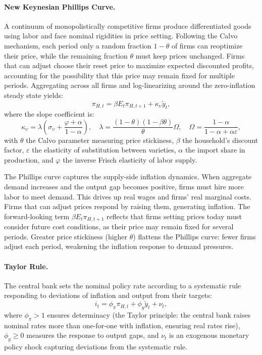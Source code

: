 \documentclass[12pt,a4paper]{article}
\begin{document}
\paragraph{New Keynesian Phillips Curve.}
A continuum of monopolistically competitive firms produce differentiated goods using labor and face nominal rigidities in price setting. Following the Calvo mechanism, each period only a random fraction $1-\theta$ of firms can reoptimize their price, while the remaining fraction $\theta$ must keep prices unchanged. Firms that can adjust choose their reset price to maximize expected discounted profits, accounting for the possibility that this price may remain fixed for multiple periods. Aggregating across all firms and log-linearizing around the zero-inflation steady state yields:
\begin{equation}
	\pi_{H,t} = \beta E_t\pi_{H,t+1} + \kappa_\upsilon\tilde{y}_t,
	\label{eq:NKPC_baseline}
\end{equation}
where the slope coefficient is:
\begin{equation}
	\kappa_\upsilon = \lambda\left(\sigma_\upsilon + \frac{\varphi+\alpha}{1-\alpha}\right), \quad \lambda = \frac{(1-\theta)(1-\beta\theta)}{\theta}\Omega, \quad \Omega = \frac{1-\alpha}{1-\alpha+\alpha\varepsilon},
	\label{eq:kappa}
\end{equation}
with $\theta$ the Calvo parameter measuring price stickiness, $\beta$ the household's discount factor, $\varepsilon$ the elasticity of substitution between varieties, $\alpha$ the import share in production, and $\varphi$ the inverse Frisch elasticity of labor supply.

The Phillips curve captures the supply-side inflation dynamics. When aggregate demand increases and the output gap becomes positive, firms must hire more labor to meet demand. This drives up real wages and firms' real marginal costs. Firms that can adjust prices respond by raising them, generating inflation. The forward-looking term $\beta E_t\pi_{H,t+1}$ reflects that firms setting prices today must consider future cost conditions, as their price may remain fixed for several periods. Greater price stickiness (higher $\theta$) flattens the Phillips curve: fewer firms adjust each period, weakening the inflation response to demand pressures.

\paragraph{Taylor Rule.}
The central bank sets the nominal policy rate according to a systematic rule responding to deviations of inflation and output from their targets:
\begin{equation}
	i_t = \phi_\pi \pi_{H,t} + \phi_y\tilde{y}_t + \nu_t,
	\label{eq:Taylor_baseline}
\end{equation}
where $\phi_\pi > 1$ ensures determinacy (the Taylor principle: the central bank raises nominal rates more than one-for-one with inflation, ensuring real rates rise), $\phi_y \geq 0$ measures the response to output gaps, and $\nu_t$ is an exogenous monetary policy shock capturing deviations from the systematic rule.
\end{document}
